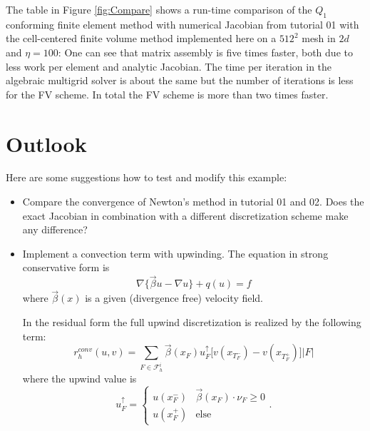 \documentclass[a4paper,12pt]{article}
\begin{document}
The table in Figure \ref{fig:Compare} shows a run-time comparison
of the $Q_1$ conforming finite element method with numerical Jacobian
from tutorial 01 with the cell-centered finite volume method implemented here
on a $512^2$ mesh in $2d$ and $\eta=100$:
One can see that matrix assembly is five times faster, both due to less work
per element and analytic Jacobian. The time per iteration in the algebraic multigrid
solver is about the same but the number of iterations is less for the FV scheme.
In total the FV scheme is more than two times faster.

\section{Outlook}

Here are some suggestions how to test and modify this example:
\begin{itemize}
\item Compare the convergence of Newton's method in tutorial 01 and 02. Does the
exact Jacobian in combination with a different discretization scheme make any difference?
\item Implement a convection term with upwinding. The equation in strong conservative
form is
$$ \nabla\{ \vec\beta u - \nabla u\} + q(u) = f $$
where $\vec\beta(x)$ is a given (divergence free) velocity field.

In the residual form the full upwind discretization is realized by the following
term:
$$r_h^{conv}(u,v) = \sum_{F\in\mathcal{F}_h^i} \vec\beta(x_F) u^\uparrow_F
\bigl[v(x_{T_F^-}) - v(x_{T_F^+})\bigr] |F|$$
where the upwind value is
$$ u^\uparrow_F = \left\{\begin{array}{ll}
u(x_F^-) & \vec\beta(x_F)\cdot\nu_F\geq 0 \\
u(x_F^+) & \text{else}
\end{array}\right . .$$
\end{itemize}

%
%
\end{document}
